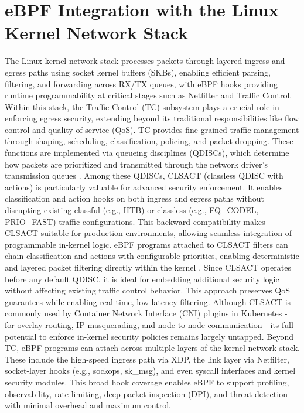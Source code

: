 \documentclass [11pt, proquest] {uwthesis}[2020/02/24]
\begin{document}



\section{eBPF Integration with the Linux Kernel Network Stack}
The Linux kernel network stack processes packets through layered ingress and egress paths using socket kernel buffers (SKBs), enabling efficient parsing, filtering, and forwarding across RX/TX queues, with eBPF hooks providing runtime programmability at critical stages such as Netfilter and Traffic Control. Within this stack, the Traffic Control (TC) subsystem plays a crucial role in enforcing egress security, extending beyond its traditional responsibilities like flow control and quality of service (QoS). TC provides fine-grained traffic management through shaping, scheduling, classification, policing, and packet dropping. These functions are implemented via queueing disciplines (QDISCs), which determine how packets are prioritized and transmitted through the network driver’s transmission queues \cite{salim2015linux}. Among these QDISCs, CLSACT (classless QDISC with actions) is particularly valuable for advanced security enforcement. It enables classification and action hooks on both ingress and egress paths without disrupting existing classful (e.g., HTB) or classless (e.g., FQ\_CODEL, PRIO\_FAST) traffic configurations. This backward compatibility makes CLSACT suitable for production environments, allowing seamless integration of programmable in-kernel logic. eBPF programs attached to CLSACT filters can chain classification and actions with configurable priorities, enabling deterministic and layered packet filtering directly within the kernel \cite{borkmann2016getting}. Since CLSACT operates before any default QDISC, it is ideal for embedding additional security logic without affecting existing traffic control behavior. This approach preserves QoS guarantees while enabling real-time, low-latency filtering. Although CLSACT is commonly used by Container Network Interface (CNI) plugins in Kubernetes - for overlay routing, IP masquerading, and node-to-node communication - its full potential to enforce in-kernel security policies remains largely untapped.
Beyond TC, eBPF programs can attach across multiple layers of the kernel network stack. These include the high-speed ingress path via XDP, the link layer via Netfilter, socket-layer hooks (e.g., sockops, sk\_msg), and even syscall interfaces and kernel security modules. This broad hook coverage enables eBPF to support profiling, observability, rate limiting, deep packet inspection (DPI), and threat detection with minimal overhead and maximum control.
\end{document}
